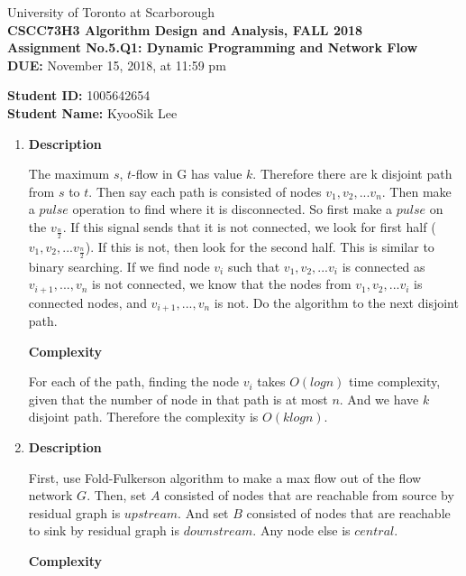\documentclass[a4paper,11pt]{article}
\begin{document}
\begin{center}
University of Toronto at Scarborough\\[0.1in]
{\bf CSCC73H3 Algorithm Design and Analysis, FALL 2018} \\[0.1in]
{\large{\bf Assignment No.5.Q1: Dynamic Programming and Network Flow}}\\[0.1in]
{\bf DUE:} November 15, 2018, at 11:59 pm
\end{center}


\vspace{0.1in}
\noindent
{\bf Student ID:} 1005642654 \\[0.15in]
{\bf Student Name:} KyooSik Lee
\vspace{0.3in}

\vspace{0.3in}
\begin{enumerate}

\item {\bf Description}

The maximum $s$, $t$-flow in G has value $k$. Therefore there are k disjoint path from $s$ to $t$. Then say each path is consisted of nodes $v_1, v_2, ... v_n$.
Then make a $pulse$ operation to find where it is disconnected. So first make a $pulse$ on the $v_\frac{n}{2}$. If this signal sends that it is not connected, we look for first half ($v_1, v_2, ... v_\frac{n}{2}$). If this is not, then look for the second half. This is similar to binary searching. If we find node $v_i$ such that $v_1, v_2, ... v_i$ is connected as $v_{i+1},...,v_n$ is not connected, we know that the nodes from  $v_1, v_2, ... v_i$ is connected nodes, and $v_{i+1},...,v_n$ is not. Do the algorithm to the next disjoint path.

{\bf Complexity}

For each of the path, finding the node $v_i$ takes $O(log n)$ time complexity, given that the number of node in that path is at most $n$. And we have $k$ disjoint path. Therefore the complexity is $O(k log n)$.

\pagebreak
\item {\bf Description}

First, use Fold-Fulkerson algorithm to make a max flow out of the flow network $G$. Then, set $A$ consisted of nodes that are reachable from source by residual graph is $upstream$. And set $B$ consisted of nodes that are reachable to sink by residual graph is $downstream$. Any node else is $central$.

{\bf Complexity}


\end{enumerate}
\end{document}
